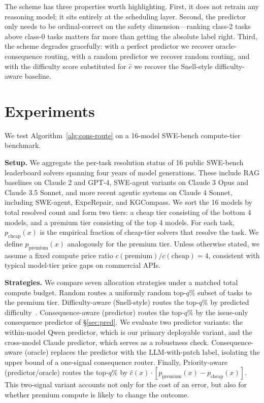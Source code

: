 \documentclass{article}
\begin{document}
The scheme has three properties worth highlighting. First, it does
not retrain any reasoning model; it sits entirely at the scheduling
layer. Second, the predictor only needs to be ordinal-correct
on the safety dimension---ranking class-2 tasks above class-0 tasks
matters far more than getting the absolute label right. Third, the
scheme degrades gracefully: with a perfect predictor we recover
oracle-consequence routing, with a random predictor we recover random
routing, and with the difficulty score substituted for $\hat{c}$ we
recover the Snell-style difficulty-aware baseline.

\section{Experiments}
\label{sec:exp}

We test Algorithm~\ref{alg:cons-route} on a 16-model SWE-bench
compute-tier benchmark.

\textbf{Setup.} We aggregate the per-task resolution status of 16
public SWE-bench leaderboard solvers spanning four years of model
generations. These include RAG baselines on Claude 2 and GPT-4,
SWE-agent variants on Claude 3 Opus and Claude 3.5 Sonnet, and more
recent agentic systems on Claude 4 Sonnet, including SWE-agent,
ExpeRepair, and KGCompass. We sort the 16 models by total resolved
count and form two tiers: a cheap tier consisting of the bottom
4 models, and a premium tier consisting of the top 4 models.
For each task, $p_{\mathrm{cheap}}(x)$ is the empirical fraction of
cheap-tier solvers that resolve the task. We define
$p_{\mathrm{premium}}(x)$ analogously for the premium tier. Unless
otherwise stated, we assume a fixed compute price ratio
$c(\text{premium})/c(\text{cheap}) = 4$, consistent with typical
model-tier price gaps on commercial APIs.

\textbf{Strategies.} We compare seven allocation strategies under a
matched total compute budget. Random routes a uniformly random
top-$q\%$ subset of tasks to the premium tier. Difficulty-aware
(Snell-style) routes the top-$q\%$ by predicted
difficulty~\citep{snell2024scaling}. Consequence-aware
(predictor) routes the top-$q\%$ by the issue-only consequence
predictor of \S\ref{sec:pred}. We evaluate two predictor variants:
the within-model Qwen predictor, which is our primary deployable
variant, and the cross-model Claude predictor, which serves as a
robustness check. Consequence-aware (oracle) replaces the
predictor with the LLM-with-patch label, isolating the upper bound of
a one-signal consequence router. Finally, Priority-aware
(predictor/oracle) routes the top-$q\%$ by
$\hat{c}(x) \cdot [p_{\mathrm{premium}}(x) -
p_{\mathrm{cheap}}(x)]$. This two-signal variant accounts not only
for the cost of an error, but also for whether premium compute is
likely to change the outcome.
\end{document}
